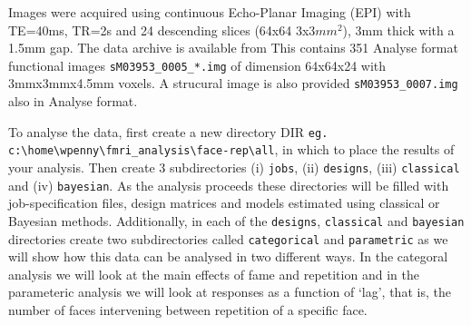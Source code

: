 \documentclass[a4paper,titlepage]{book}
\begin{document}
Images were acquired using continuous Echo-Planar 
Imaging (EPI) with TE=40ms, TR=2s and 24 descending slices (64x64 3x3$mm^2$), 3mm thick with a 1.5mm gap.
The data archive is available from 
This contains 351 Analyse format functional images
\verb!sM03953_0005_*.img! of dimension 
64x64x24 with 3mmx3mmx4.5mm voxels. A strucural 
image is also provided \verb!sM03953_0007.img! also in Analyse format.

To analyse the data, first create a new directory DIR 
\newline \verb!eg. c:\home\wpenny\fmri_analysis\face-rep\all!, in which to place the results
of your analysis. Then create 3 subdirectories (i) \verb!jobs!, 
(ii) \verb!designs!, (iii) \verb!classical! and (iv) \verb!bayesian!. As the analysis 
proceeds these directories will be filled with job-specification files, design matrices 
and models estimated using classical or Bayesian 
methods. Additionally, in each of the \verb!designs!, \verb!classical! and \verb!bayesian! directories create 
two subdirectories called \verb!categorical! and 
\verb!parametric! as we will show how this data 
can be analysed in two different ways. 
In the categoral analysis we will look at the 
main effects of fame and repetition and in the 
parameteric analysis we will look at 
responses as a function of `lag', that is, the number of faces intervening between repetition of a specific face.
\end{document}
